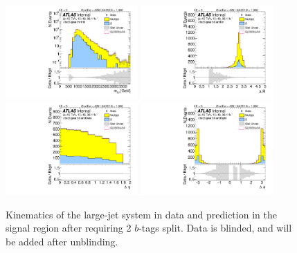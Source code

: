 \begin{figure}[htbp!]
\begin{center}
\includegraphics[width=0.45\textwidth,angle=-90]{figures/boosted/Signal/b77_TwoTag_split_Signal_mHH_l_1_blind.pdf}
\includegraphics[width=0.45\textwidth,angle=-90]{figures/boosted/Signal/b77_TwoTag_split_Signal_hCandDr_blind.pdf}\\
\includegraphics[width=0.45\textwidth,angle=-90]{figures/boosted/Signal/b77_TwoTag_split_Signal_hCandDeta_blind.pdf}
\includegraphics[width=0.45\textwidth,angle=-90]{figures/boosted/Signal/b77_TwoTag_split_Signal_hCandDphi_blind.pdf}
  \caption{Kinematics of the large-\R jet system in data and prediction in the signal region after requiring 2 $b$-tags split. Data is blinded, and will be added after unblinding. }
  \label{fig:boosted-2bs-signal-blind-ak10-system}
\end{center}
\end{figure}

\clearpage



